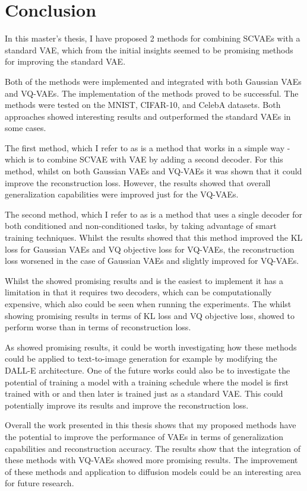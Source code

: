 \chapter{Conclusion}

In this master's thesis, I have proposed 2 methods for combining SCVAEs with a standard VAE, which from the initial insights seemed to be promising methods for improving the standard VAE.

Both of the methods were implemented and integrated with both Gaussian VAEs and VQ-VAEs. The implementation of the methods proved to be successful. The methods were tested on the MNIST, CIFAR-10, and CelebA datasets. Both approaches showed interesting results and outperformed the standard VAEs in some cases.

The first method, which I refer to as  is a method that works in a simple way - which is to combine SCVAE with VAE by adding a second decoder. For this method, whilst on both Gaussian VAEs and VQ-VAEs it was shown that it could improve the reconstruction loss. However, the results showed that overall generalization capabilities were improved just for the VQ-VAEs. 

The second method, which I refer to as  is a method that uses a single decoder for both conditioned and non-conditioned tasks, by taking advantage of smart training techniques. Whilst the results showed that this method improved the KL loss for Gaussian VAEs and VQ objective loss for VQ-VAEs, the reconstruction loss worsened in the case of Gaussian VAEs and slightly improved for VQ-VAEs.

Whilst the  showed promising results and is the easiest to implement it has a limitation in that it requires two decoders, which can be computationally expensive, which also could be seen when running the experiments. The  whilst showing promising results in terms of KL loss and VQ objective loss, showed to perform worse than  in terms of reconstruction loss.

As  showed promising results, it could be worth investigating how these methods could be applied to text-to-image generation for example by modifying the DALL-E architecture. One of the future works could also be to investigate the potential of training a model with a training schedule where the model is first trained with  or  and then later is trained just as a standard VAE. This could potentially improve its results and improve the reconstruction loss.

Overall the work presented in this thesis shows that my proposed methods have the potential to improve the performance of VAEs in terms of generalization capabilities and reconstruction accuracy. The results show that the integration of these methods with VQ-VAEs showed more promising results. The improvement of these methods and application to diffusion models could be an interesting area for future research.


